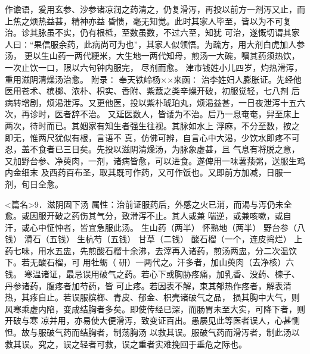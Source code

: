 \documentclass[a4paper,12pt,UTF8,twoside]{ctexbook}
\begin{document}
作谵语，爰用玄参、沙参诸凉润之药清之，仍复滑泻，再投以前方一剂泻又止，而上焦之烦热益甚，精神亦益 
昏愦，毫无知觉。此时其家人毕至，皆以为不可复治。诊其脉虽不实，仍有根柢，至数虽数，不过六至，知犹 
可治，遂慨切谓其家人曰∶“果信服余药，此病尚可为也”，其家人似领悟。为疏方，用大剂白虎加人参汤， 
更以生山药一两代粳米，大生地一两代知母，煎汤一大碗，嘱其药须热饮，一次止饮一口，限以六句钟内服完， 
尽剂而愈。 
津市钱姓小儿四岁，灼热滑泻，重用滋阴清燥汤治愈。 
附录∶ 
奉天铁岭杨××来函∶ 
治李姓妇人膨胀证。先经他医用苍术、槟榔、浓朴、枳实、香附、紫蔻之类辛燥开破，初服觉轻，七八剂 
后病转增剧，烦渴泄泻。又更他医，投以紫朴琥珀丸，烦渴益甚，一日夜泄泻十五六次，再诊时，医者辞不治。 
又延医数人，皆诿为不治。后乃一息奄奄，舁至床上两次，待时而已。其姻家有知生者强生往视。其脉如水上 
浮麻，不分至数，按之即无，惟两尺犹似有根，言语不 
真，仿佛可辨，自言心中大渴，少饮水即疼不可忍，盖不食者已三日矣。先投以滋阴清燥汤，为脉象虚甚，且 
气息有将脱之意，又加野台参、净萸肉，一剂，诸病皆愈，可以进食。遂俾用一味薯蓣粥，送服生鸡内金细末 
及西药百布圣，取其既可作药，又可作饭也。又即前方加减，日服一剂，旬日全愈。 


<篇名>9．滋阴固下汤
属性：治前证服药后，外感之火已消，而渴与泻仍未全愈。或因服开破之药伤其气分，致滑泻不止。其人或兼 
喘逆，或兼咳嗽，或自汗，或心中怔忡者，皆宜急服此汤。 
生山药（两半） 怀熟地（两半） 野台参（八钱） 滑石（五钱） 生杭芍（五钱） 甘草（二钱） 
酸石榴（一个，连皮捣烂） 
上药七味，用水五盅，先煎酸石榴十余沸，去滓再入诸药，煎汤两盅，分二次温饮下。若无酸石榴，可 
用牡蛎（ 研）一两代之。汗多者，加山萸肉（去净核）六钱。 
寒温诸证，最忌误用破气之药。若心下或胸胁疼痛，加乳香、没药、楝子、丹参诸药，腹疼者加芍药，皆 
可止疼。若因表不解，束其郁热作疼者，解表清热，其疼自止。若误服槟榔、青皮、郁金、枳壳诸破气之品， 
损其胸中大气，则风寒乘虚内陷，变成结胸者多矣。即使传经已深，而肠胃未至大实，可降下者，则开破与寒 
凉并用，亦易使大便滑泻，致变证百出。愚屡见此等医者误人，心甚恻怛。故与服破气药而结胸者，制荡胸汤 
以救其误。服破气药而滑泻者，制此汤以救其误。究之，误之轻者可救，误之重者实难挽回于垂危之际也。 
\end{document}
